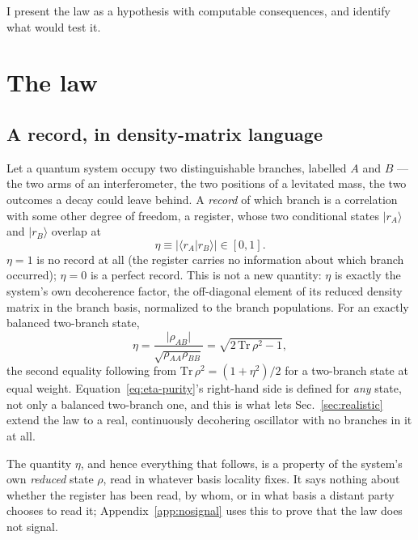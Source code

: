 \documentclass[aps,pra,reprint,amsmath,amssymb,superscriptaddress]{revtex4-2}
\begin{document}
I present the law as a hypothesis with computable consequences, and identify
what would test it.

\section{The law}
\label{sec:law}

\subsection{A record, in density-matrix language}

Let a quantum system occupy two distinguishable branches, labelled $A$ and
$B$ --- the two arms of an interferometer, the two positions of a levitated
mass, the two outcomes a decay could leave behind. A \emph{record} of which
branch is a correlation with some other degree of freedom, a register, whose
two conditional states $\lvert r_A\rangle$ and $\lvert r_B\rangle$ overlap at
\begin{equation}
  \eta \equiv \lvert \langle r_A | r_B \rangle \rvert \in [0,1].
\end{equation}
$\eta=1$ is no record at all (the register carries no information about which
branch occurred); $\eta=0$ is a perfect record. This is not a new
quantity: $\eta$ is exactly the system's own decoherence factor, the
off-diagonal element of its reduced density matrix in the branch basis,
normalized to the branch populations. For an exactly balanced
two-branch state,
\begin{equation}
  \eta = \frac{\lvert \rho_{AB}\rvert}{\sqrt{\rho_{AA}\rho_{BB}}}
       = \sqrt{2\,\mathrm{Tr}\,\rho^2 - 1},
  \label{eq:eta-purity}
\end{equation}
the second equality following from $\mathrm{Tr}\,\rho^2 = (1+\eta^2)/2$ for a
two-branch state at equal weight. Equation~\eqref{eq:eta-purity}'s
right-hand side is defined for \emph{any} state, not only a balanced
two-branch one, and this is what lets Sec.~\ref{sec:realistic} extend the law
to a real, continuously decohering oscillator with no branches in it at all.

The quantity $\eta$, and hence everything that follows, is a property of the
system's own \emph{reduced} state $\rho$, read in whatever basis locality
fixes. It says nothing about whether the register has been read, by whom, or
in what basis a distant party chooses to read it; Appendix~\ref{app:nosignal}
uses this to prove that the law does not signal.
\end{document}
